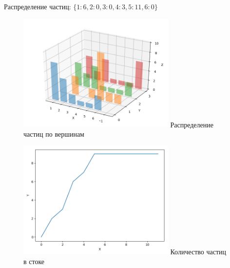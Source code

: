 \newpage

\begin{example}
	Распределение частиц: $\{1: 6, 2: 0, 3: 0, 4: 3, 5: 11, 6: 0\}$
	
	\begin{figure}
		\centering	
		{\includegraphics[width=0.7\textwidth]{img/e2.png}}
		{Распределение частиц по вершинам}
		\label{fig:pic_e2}
	\end{figure}
	
	\begin{figure}
		\centering	
		{\includegraphics[width=0.7\textwidth]{img/e22.png}}
		{Количество частиц в стоке}
		\label{fig:pic_e22}
	\end{figure}
	
\end{example}

\newpage

